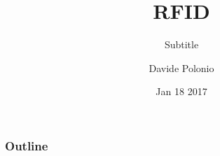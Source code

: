 \documentclass{beamer}
\title{RFID} %
\subtitle{\newline Subtitle}
\author{Davide Polonio}
\date{Jan 18 2017}
\institute{University of Padova}
\begin{document}
\newcommand{\turnOffNumbers}{true}
\begin{frame}[noframenumbering]
\titlepage
\end{frame}
\let\turnOffNumbers\empty
\begin{frame}
	\frametitle{Outline}
	\tableofcontents
\end{frame}



\makethanks
\end{document}
